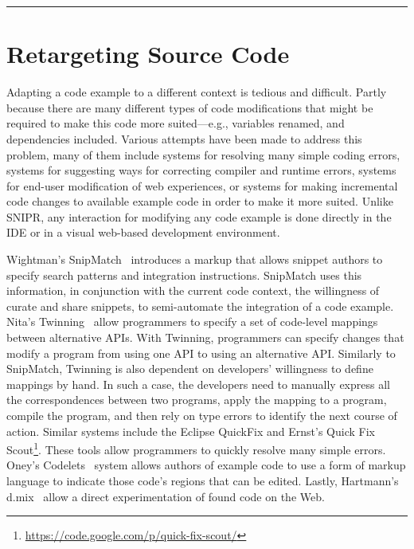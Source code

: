 \fancybreak{\pfbreakdisplay}

\section{Retargeting Source Code}
\label{sec:retargetingcode}

Adapting a code example to a different context is tedious and difficult. Partly because there are many different types of code modifications that might be required to make this code more suited---e.g., variables renamed, and dependencies included. Various attempts have been made to address this problem, many of them include systems for resolving many simple coding errors, systems for suggesting ways for correcting compiler and runtime errors, systems for end-user modification of web experiences, or systems for making incremental code changes to available example code in order to make it more suited. Unlike \uppercase{SnipR}, any interaction for modifying any code example is done directly in the IDE or in a visual web-based development environment.  

Wightman's SnipMatch~\cite{Wightman:2012gc} introduces a markup that allows snippet authors to specify search patterns and integration instructions. SnipMatch uses this information, in conjunction with the current code context, the willingness of curate and share snippets, to semi-automate the integration of a code example. Nita's Twinning~\cite{Nita:2010en} allow programmers to specify a set of code-level mappings between alternative APIs. With Twinning, programmers can specify changes that modify a program from using one API to using an alternative API. Similarly to SnipMatch, Twinning is also dependent on developers' willingness to define mappings by hand. In such a case, the developers need to manually express all the correspondences between two programs, apply the mapping to a program, compile the program, and then rely on type errors to identify the next course of action.  Similar systems include the Eclipse QuickFix and Ernst's Quick Fix Scout\footnote{\url{https://code.google.com/p/quick-fix-scout/}}. These tools allow programmers to quickly resolve many simple errors. Oney's Codelets~\cite{Oney:2012ge} system allows authors of example code to use a form of markup language to indicate those code's regions that can be edited. Lastly, Hartmann's d.mix~\cite{Hartmann:2007wf} allow a direct experimentation of found code on the Web.

